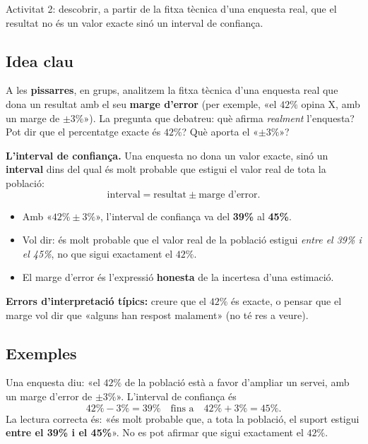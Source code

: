 %
{Activitat 2: descobrir, a partir de la fitxa tècnica d'una enquesta real, que el resultat no és un valor exacte sinó un interval de confiança.}

\subsection{Idea clau}

A les \textbf{pissarres}, en grups, analitzem la fitxa tècnica d'una enquesta real que
dona un resultat amb el seu \textbf{marge d'error} (per exemple, «el $42\%$ opina X, amb un
marge de $\pm 3\%$»). La pregunta que debatreu: què afirma \emph{realment} l'enquesta? Pot
dir que el percentatge exacte és $42\%$? Què aporta el «$\pm 3\%$»?

\begin{idea}
\textbf{L'interval de confiança.} Una enquesta no dona un valor exacte, sinó un
\textbf{interval} dins del qual és molt probable que estigui el valor real de tota la
població:
\[
\text{interval} = \text{resultat} \pm \text{marge d'error}.
\]
\begin{itemize}[leftmargin=1.4em, itemsep=2pt]
  \item Amb «$42\%\pm 3\%$», l'interval de confiança va del \textbf{39\%} al \textbf{45\%}.
  \item Vol dir: és molt probable que el valor real de la població estigui \emph{entre el
        39\% i el 45\%}, no que sigui exactament el $42\%$.
  \item El marge d'error és l'expressió \textbf{honesta} de la incertesa d'una estimació.
\end{itemize}
\textbf{Errors d'interpretació típics:} creure que el $42\%$ és exacte, o pensar que el
marge vol dir que «alguns han respost malament» (no té res a veure).
\end{idea}

\subsection{Exemples}

\begin{exemple}
Una enquesta diu: «el $42\%$ de la població està a favor d'ampliar un servei, amb un marge
d'error de $\pm 3\%$». L'interval de confiança és
\[
42\%-3\%=39\% \quad\text{fins a}\quad 42\%+3\%=45\%.
\]
La lectura correcta és: «és molt probable que, a tota la població, el suport estigui
\textbf{entre el 39\% i el 45\%}». No es pot afirmar que sigui exactament el $42\%$.
\end{exemple}

